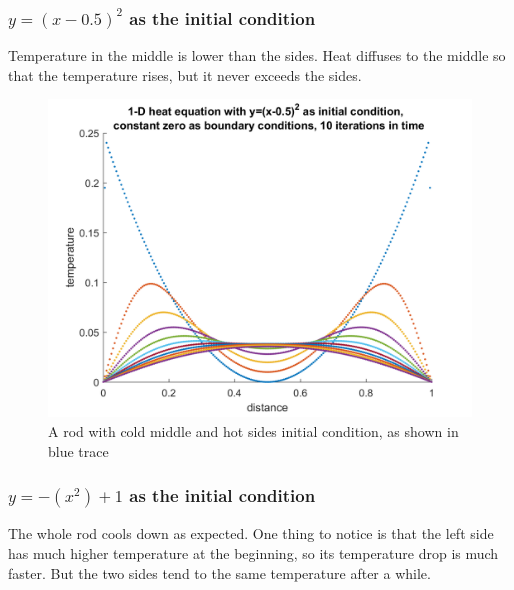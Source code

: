 \documentclass[a4paper, 12pt]{article}
\begin{document}
\newpage
\subsubsection{$y=(x-0.5)^2$ as the initial condition}
Temperature in the middle is lower than the sides. Heat diffuses to the middle so that the temperature rises, but it never exceeds the sides.

\begin{figure}[h]
\centering
\includegraphics[width=\textwidth]{ex4/plots/custom_cup.png}
\caption{A rod with cold middle and hot sides initial condition, as shown in blue trace}
\end{figure}


\newpage
\subsubsection{$y=-(x^2)+1$ as the initial condition}
The whole rod cools down as expected. One thing to notice is that the left side has much higher temperature at the beginning, so its temperature drop is much faster. But the two sides tend to the same temperature after a while.
\end{document}

